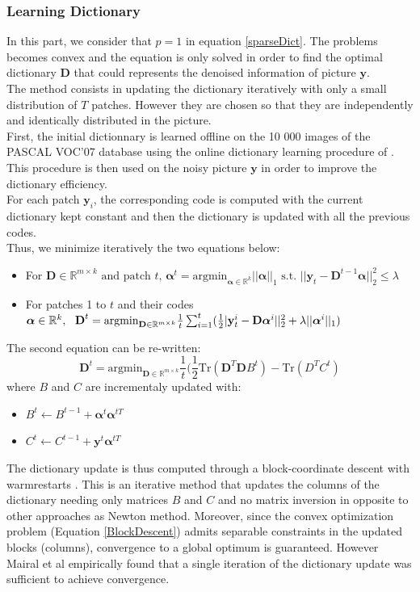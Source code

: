 \documentclass{ipol}
\newcommand{\psize}{m}
\newcommand{\dsize}{k}
\newcommand{\dict}{\textbf{D}}
\newcommand{\code}{\bm{\alpha}}
\newcommand{\pnorm}{p}
\newcommand{\noi}{\textbf{y}}
\newcommand{\RR}{\mathbb{R}}
\newcommand{\argmin}{\text{argmin}}
\begin{document}
\subsubsection{Learning Dictionary}

In this part, we consider that $\pnorm = 1$ in equation \eqref{sparseDict}. The problems becomes convex and the equation is only solved in order to find the optimal dictionary $\dict$ that could represents the denoised information of picture $\noi$.\\
The method consists in updating the dictionary iteratively with only a small distribution of $T$ patches. However they are chosen so that they are independently and identically distributed in the picture.\\
First, the initial dictionnary is learned offline on the 10 000 images of the PASCAL VOC'07 database using the  online dictionary learning procedure of \cite{onlineLearning}. This procedure is then used on the noisy picture $\noi$ in order to improve the dictionary efficiency.\\
For each patch $\noi_i$, the corresponding code is computed with the current dictionary kept constant and then the dictionary is updated with all the previous codes.\\
Thus, we minimize iteratively the two equations below:
\begin{itemize}
	\item For $\dict \in \RR^{\psize \times \dsize} \text{ and patch $t$, } \code^t = \argmin_{\code \in \RR^\dsize} ||\code||_1 \text{ s.t. } ||\noi_t - \dict^{t-1} \code||_2^2 \leq \lambda$
	\item For patches 1 to $t$ and their codes $\code \in \RR^\dsize, \ \ \dict^{t}= \argmin_{\dict \in \RR^{\psize \times \dsize}} \frac{1}{t} \sum_{i=1}^t (\frac{1}{2}|\textbf{\noi}_t^i - \dict \code^i||^2_2 + \lambda ||\code^i||_1)$
\end{itemize}
The second equation can be re-written:
\begin{equation}
	\dict^{t}= \argmin_{\dict \in \RR^{\psize \times \dsize}} \frac{1}{t} (\frac{1}{2} \text{Tr}(\dict^T \dict B^t)- \text{Tr}(D^T C^t )
	\label{BlockDescent}
\end{equation}
where $B$ and $C$ are incrementaly updated with:
\begin{itemize}
	\item $B^t \leftarrow B^{t-1} + \code^t \code^{tT}$
	\item $C^t \leftarrow C^{t-1} + \noi^t \code^{tT}$
\end{itemize}
The dictionary update is thus computed through a block-coordinate descent with warmrestarts \cite{BlockDescent}. This is an iterative method that updates the columns of the dictionary needing only matrices $B$ and $C$ and no matrix inversion in opposite to other approaches as Newton method. Moreover, since the convex optimization problem (Equation \eqref{BlockDescent}) admits separable constraints in the updated blocks (columns), convergence to a global optimum is guaranteed. However Mairal et al empirically found that a single iteration of the dictionary update was sufficient to achieve convergence.
\end{document}
